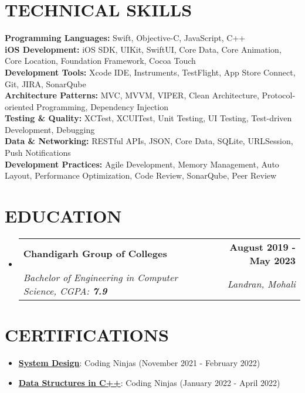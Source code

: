 \documentclass[letterpaper,11pt]{article}
\makeatletter
\newcommand{\resumeItem}[1]{
  \item\small{
    {#1 \vspace{-2pt}}
  }
}
\newcommand{\resumeSubheading}[4]{
  \vspace{-2pt}\item
    \begin{tabular*}{1.0\textwidth}[t]{l@{\extracolsep{\fill}}r}
      \textbf{\large#1} & \textbf{\small #2} \\
      \textit{\large#3} & \textit{\small #4} \\
      
    \end{tabular*}\vspace{-7pt}
}
\newcommand{\resumeSubHeadingListStart}{\begin{itemize}[leftmargin=0.0in, label={}]}
\newcommand{\resumeSubHeadingListEnd}{\end{itemize}}
\newcommand{\resumeItemListStart}{\begin{itemize}}
\newcommand{\resumeItemListEnd}{\end{itemize}\vspace{-5pt}}
\makeatother
\begin{document}
\section{TECHNICAL SKILLS}
 \begin{itemize}[leftmargin=0.15in, label={}]
    \small{\item{
     \textbf{\normalsize{Programming Languages:}}{ 
     \normalsize{Swift, Objective-C, JavaScript, C++}} \\
     \textbf{\normalsize{iOS Development:}}{ 
     \normalsize{iOS SDK, UIKit, SwiftUI, Core Data, Core Animation, Core Location, Foundation Framework, Cocoa Touch}} \\
     \textbf{\normalsize{Development Tools:}}{ 
     \normalsize{Xcode IDE, Instruments, TestFlight, App Store Connect, Git, JIRA, SonarQube}} \\
     \textbf{\normalsize{Architecture Patterns:}}{ 
     \normalsize{MVC, MVVM, VIPER, Clean Architecture, Protocol-oriented Programming, Dependency Injection}} \\
     \textbf{\normalsize{Testing \& Quality:}}{ 
     \normalsize{XCTest, XCUITest, Unit Testing, UI Testing, Test-driven Development, Debugging}} \\
     \textbf{\normalsize{Data \& Networking:}}{ 
     \normalsize{RESTful APIs, JSON, Core Data, SQLite, URLSession, Push Notifications}} \\
     \textbf{\normalsize{Development Practices:}}{ 
     \normalsize{Agile Development, Memory Management, Auto Layout, Performance Optimization, Code Review, SonarQube, Peer Review}} \\
    }}
 \end{itemize}

\section{EDUCATION}
  \resumeSubHeadingListStart
    \resumeSubheading
      {Chandigarh Group of Colleges}{August 2019 - May 2023}
      {Bachelor of Engineering in Computer Science, CGPA: \textbf{7.9}}{Landran, Mohali}
  \resumeSubHeadingListEnd

\section{CERTIFICATIONS}
    \vspace{0pt}
    \resumeItemListStart
        \resumeItem{\normalsize{\href{http://ninjasfiles.s3.amazonaws.com/certificate18894980e4209379ac28665887f78da42bac5c2.pdf}{\textbf{System Design}}: Coding Ninjas (November 2021 - February 2022)}}
        \resumeItem{\normalsize{\href{https://ninjasfiles.s3.amazonaws.com/certificate19853580c201378561a01f48ae87f59e9220db2.pdf}{\textbf{Data Structures in C++}}: Coding Ninjas (January 2022 - April 2022)}}
    \resumeItemListEnd
\end{document}
